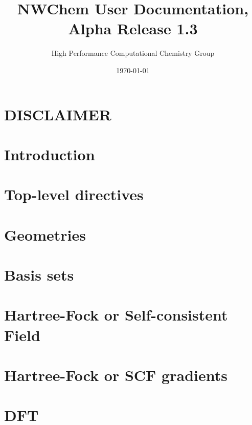 \setlength{\parskip}{6pt}

\newcommand{\nwchemversion}{1.3}
\newcommand{\nwchemyear}{1996}



\title{\bf\Large NWChem User Documentation, Alpha Release \nwchemversion}
\author{High Performance Computational Chemistry Group}
\date{\today}
\maketitle

\section*{\center DISCLAIMER}


\clearpage

\tableofcontents

\clearpage

\section{Introduction}


\section{Top-level directives}


\section{Geometries}


\section{Basis sets}


\section{Hartree-Fock or Self-consistent Field} 


\section{Hartree-Fock or SCF gradients}


\section{DFT}


